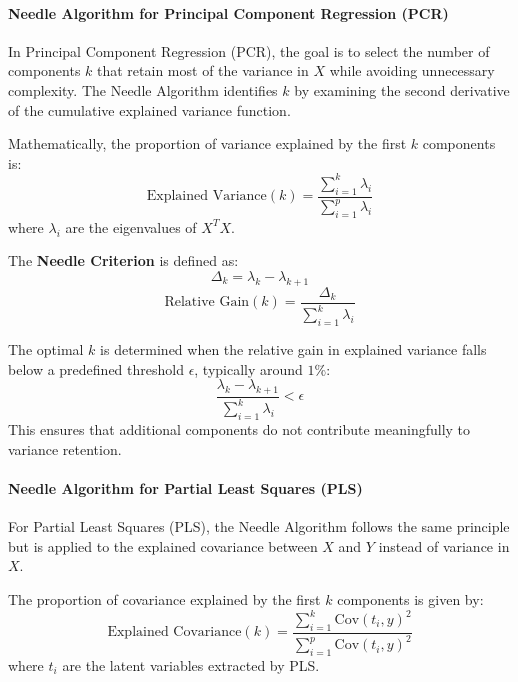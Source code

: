 \documentclass[11pt,twoside,a4paper]{article}
\begin{document}
\paragraph{Needle Algorithm for Principal Component Regression (PCR)}
In Principal Component Regression (PCR), the goal is to select the number of components \( k \) that retain most of the variance in \( X \) while avoiding unnecessary complexity. The Needle Algorithm identifies \( k \) by examining the second derivative of the cumulative explained variance function.

Mathematically, the proportion of variance explained by the first \( k \) components is:
\begin{equation}
\text{Explained Variance}(k) = \frac{\sum_{i=1}^{k} \lambda_i}{\sum_{i=1}^{p} \lambda_i}
\end{equation}
where \( \lambda_i \) are the eigenvalues of \( X^T X \). 

The \textbf{Needle Criterion} is defined as:
\begin{equation}
\Delta_k = \lambda_k - \lambda_{k+1}
\end{equation}
\begin{equation}
\text{Relative Gain}(k) = \frac{\Delta_k}{\sum_{i=1}^{k} \lambda_i}
\end{equation}

The optimal \( k \) is determined when the relative gain in explained variance falls below a predefined threshold \( \epsilon \), typically around \( 1\% \):
\begin{equation}
\frac{\lambda_k - \lambda_{k+1}}{\sum_{i=1}^{k} \lambda_i} < \epsilon
\end{equation}
This ensures that additional components do not contribute meaningfully to variance retention.

\paragraph{Needle Algorithm for Partial Least Squares (PLS)}
For Partial Least Squares (PLS), the Needle Algorithm follows the same principle but is applied to the explained covariance between \( X \) and \( Y \) instead of variance in \( X \). 

The proportion of covariance explained by the first \( k \) components is given by:
\begin{equation}
\text{Explained Covariance}(k) = \frac{\sum_{i=1}^{k} \text{Cov}(t_i, y)^2}{\sum_{i=1}^{p} \text{Cov}(t_i, y)^2}
\end{equation}
where \( t_i \) are the latent variables extracted by PLS.
\end{document}
